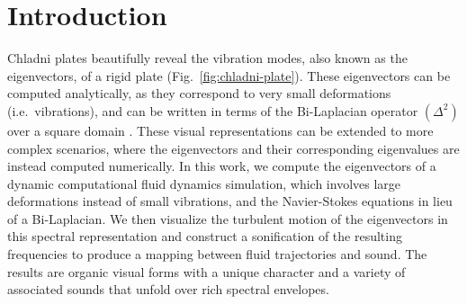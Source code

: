 \documentclass[11pt]{article}
\begin{document}
\section*{Introduction}
Chladni plates beautifully reveal the vibration modes, also known as the eigenvectors, of a rigid plate (Fig.~\ref{fig:chladni-plate}). These eigenvectors can be computed analytically, as they correspond to very small deformations (i.e.~vibrations), and can be written in terms of the Bi-Laplacian operator $(\Delta^2)$ over a square domain \cite{gander2012euler}. These visual representations can be extended to more complex scenarios, where the eigenvectors and their corresponding eigenvalues are instead computed numerically. In this work, we compute the eigenvectors of a dynamic computational fluid dynamics simulation, which involves large deformations instead of small vibrations, and the Navier-Stokes equations in lieu of a Bi-Laplacian. We then visualize the turbulent motion of the eigenvectors in this spectral representation and construct a sonification of the resulting frequencies to produce a mapping between fluid trajectories and sound. The results are organic visual forms with a unique character and a variety of associated sounds that unfold over rich spectral envelopes.
\end{document}
